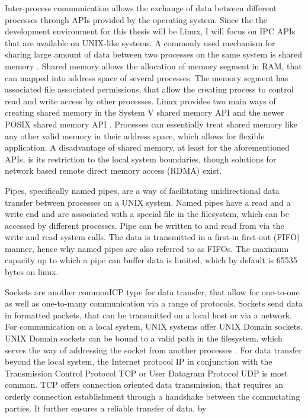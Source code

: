 Inter-process communication allows the exchange of data between different processes through APIs provided by the operating system. Since the
the development environment for this thesis will be Linux, I will focus on \ac{IPC} APIs that are available on UNIX-like systems.
A commonly used mechanism for sharing large amount of data between two processes on the same system is shared memory \cite[p.301ff.]{stevens1998ipc}.
Shared memory allows the allocation of memory segment in RAM, that can mapped into address space of several processes. The memory segment has associated file associated permissions, that 
allow the creating process to control read and write access by other processes. Linux provides two main ways of creating
shared memory in the System V shared memory API \cite{systemvshm} and the newer POSIX shared memory API \cite{posixshm}. Processes can essentially treat shared memory like 
any other valid memory in their address space, which allows for flexible application. A disadvantage of shared memory, at least for the aforementioned APIs, is its restriction 
to the local system boundaries, though solutions for network based remote direct memory access (RDMA) exist\cite{recio2007}.
\par 
Pipes, specifically named pipes, are a way of facilitating unidirectional data transfer between processes on a UNIX system. Named pipes have a read and a write end and are  
associated with a special file in the filesystem, which can be accessed by different processes. Pipe can be written to and read from via the write and read system calls. The data is transmitted in 
a first-in first-out (FIFO) manner, hence why named pipes are also referred to as FIFOs. The maximum capacity up to which a pipe can buffer data is limited, which by default is 65535 bytes on linux. \cite{pipe}   
\par
Sockets are another common\ac{ICP} type for data transfer, that allow for one-to-one as well as one-to-many 
communication via a range of protocols\cite[p.57ff.]{stevens1998sock}. Sockets send data in formatted packets, that can be transmitted on a local host or via a network. For communication on a local system, UNIX systems offer UNIX Domain sockets. UNIX Domain sockets can be bound to a valid path in the filesystem, which serves the way of addressing
the socket from another processes \cite{unixsock}. For data transfer beyond the local system, the Internet protocol \ac{IP} in conjunction with the Transmission Control Protocol \ac{TCP} or User Datagram 
Protocol \ac{UDP} is most common. TCP offers connection oriented data transmission, that requires an orderly connection establishment through a handshake between the commutating parties. It further ensures a reliable transfer of data, by       
